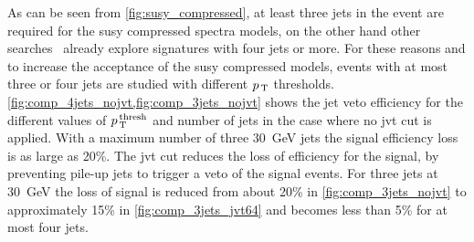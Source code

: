 As can be seen from \cref{fig:susy_compressed}, at least three jets in the event
are required for the \gls{susy} compressed spectra models, on the other hand
other searches~\cite{MultijetSUSY} already explore signatures with four jets or
more. For these reasons and to increase the acceptance of the \gls{susy}
compressed models, events with at most three or four jets are studied with
different $p_\mathrm{\, T}$ thresholds.  \cref{fig:comp_4jets_nojvt,fig:comp_3jets_nojvt}
shows the jet veto efficiency for the different values of
$p_\mathrm{\, T}^{\mathrm{\, thresh}}$ and number of jets in the case where no \gls{jvt} cut
is applied. With a maximum number of three 30~GeV jets the signal efficiency
loss is as large as 20\%. The \gls{jvt} cut reduces the loss of efficiency for
the signal, by preventing pile-up jets to trigger a veto of the signal
events. For three jets at 30~GeV the loss of signal is reduced from about 20\%
in \cref{fig:comp_3jets_nojvt} to approximately 15\% in
\cref{fig:comp_3jets_jvt64} and becomes less than 5\% for at most four jets.
